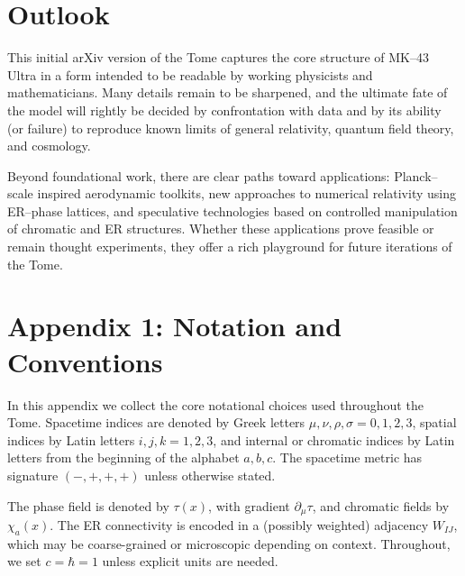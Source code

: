 \chapter*{Outlook}

This initial arXiv version of the Tome captures the core structure of MK--43 Ultra in a form intended to be readable by working physicists and mathematicians.
Many details remain to be sharpened, and the ultimate fate of the model will rightly be decided by confrontation with data and by its ability (or failure) to reproduce known limits of general relativity, quantum field theory, and cosmology.

Beyond foundational work, there are clear paths toward applications:
Planck--scale inspired aerodynamic toolkits, new approaches to numerical relativity using ER--phase lattices, and speculative technologies based on controlled manipulation of chromatic and ER structures.
Whether these applications prove feasible or remain thought experiments, they offer a rich playground for future iterations of the Tome.






\appendix
\renewcommand{\thechapter}{\arabic{chapter}}

\chapter{Appendix 1: Notation and Conventions}

In this appendix we collect the core notational choices used throughout the Tome.
Spacetime indices are denoted by Greek letters \(\mu,\nu,\rho,\sigma = 0,1,2,3\), spatial indices by Latin letters \(i,j,k = 1,2,3\), and internal or chromatic indices by Latin letters from the beginning of the alphabet \(a,b,c\).
The spacetime metric has signature \((-,+,+,+)\) unless otherwise stated.

The phase field is denoted by \(\tau(x)\), with gradient \(\partial_\mu \tau\), and chromatic fields by \(\chi_a(x)\).
The ER connectivity is encoded in a (possibly weighted) adjacency \(W_{IJ}\), which may be coarse-grained or microscopic depending on context.
Throughout, we set \(c = \hbar = 1\) unless explicit units are needed.

